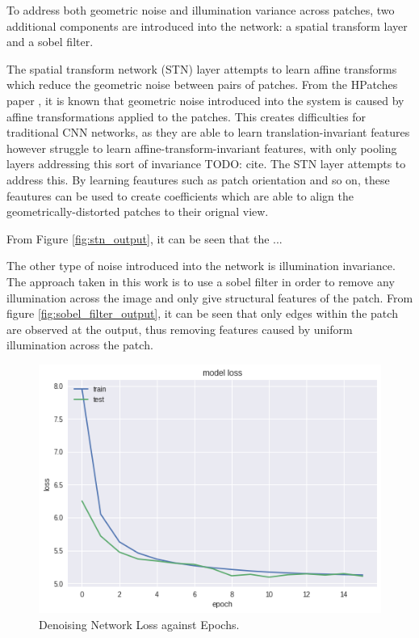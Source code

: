 \documentclass[10pt,twocolumn,letterpaper]{article}
\begin{document}
To address both geometric noise and illumination variance across patches, two additional components are introduced into the network: a spatial transform layer and a sobel filter. 

The spatial transform network (STN) layer attempts to learn affine transforms which reduce the geometric noise between pairs of patches. From the HPatches paper \cite{hpatches}, it is known that geometric noise introduced into the system is caused by affine transformations applied to the patches. This creates difficulties for traditional CNN networks, as they are able to learn translation-invariant features however struggle to learn affine-transform-invariant features, with only pooling layers addressing this sort of invariance TODO: cite. The STN layer attempts to address this. By learning feautures such as patch orientation and so on, these feautures can be used to create coefficients which are able to align the geometrically-distorted patches to their orignal view.

From Figure \ref{fig:stn_output}, it can be seen that the ...


The other type of noise introduced into the network is illumination invariance. The approach taken in this work is to use a sobel filter in order to remove any illumination across the image and only give structural features of the patch. From figure \ref{fig:sobel_filter_output}, it can be seen that only edges within the patch are observed at the output, thus removing features caused by uniform illumination across the patch.

 
{\small


}

\begin{figure}[H]
\centering
  \includegraphics[width=0.65\linewidth]{figures/denoise_train.png}
  \caption{Denoising Network Loss against Epochs.}
  \label{fig:denoise_loss}
\end{figure}
\end{document}

